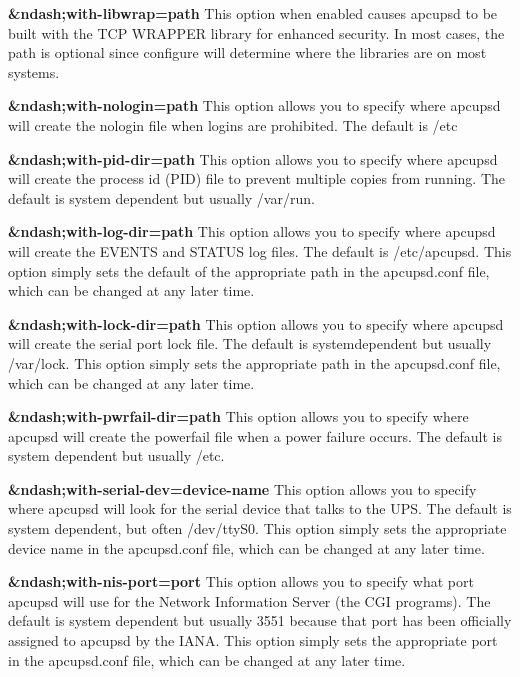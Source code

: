 \begin{description}
\item {\bf \&ndash;with-libwrap=\lt{}path\gt{}}
This option when enabled causes apcupsd to be built with the TCP WRAPPER
library for enhanced security. In most cases, the \lt{}path\gt{} is optional
since configure will determine where the libraries are on most systems.  

\item {\bf \&ndash;with-nologin=\lt{}path\gt{}}
This option allows you to specify where apcupsd will create the nologin file
when logins are prohibited. The default is /etc  

\item {\bf \&ndash;with-pid-dir=\lt{}path\gt{}}
This option allows you to specify where apcupsd will create the process id
(PID) file to prevent multiple copies from running. The default is system
dependent but usually /var/run.  

\item {\bf \&ndash;with-log-dir=\lt{}path\gt{}}
This option allows you to specify where apcupsd will create the EVENTS and
STATUS log files. The default is /etc/apcupsd. This option simply sets the
default of the appropriate path in the apcupsd.conf file, which can be changed
at any later time.  

\item {\bf \&ndash;with-lock-dir=\lt{}path\gt{}}
This option allows you to specify where apcupsd will create the serial port
lock file. The default is systemdependent but usually /var/lock. This option
simply sets the appropriate path in the apcupsd.conf file, which can be
changed at any later time.  

\item {\bf \&ndash;with-pwrfail-dir=\lt{}path\gt{}}
This option allows you to specify where apcupsd will create the powerfail file
when a power failure occurs. The default is system dependent but usually /etc.
 

\item {\bf \&ndash;with-serial-dev=\lt{}device-name\gt{}}
This option allows you to specify where apcupsd will look for the serial
device that talks to the UPS. The default is system dependent, but often
/dev/ttyS0. This option simply sets the appropriate device name in the
apcupsd.conf file, which can be changed at any later time.  

\item {\bf \&ndash;with-nis-port=\lt{}port\gt{}}
This option allows you to specify what port apcupsd will use for the Network
Information Server (the CGI programs). The default is system dependent but
usually 3551 because that port has been officially assigned to apcupsd by the
IANA. This option simply sets the appropriate port in the apcupsd.conf file,
which can be changed at any later time.  


\end{description}
